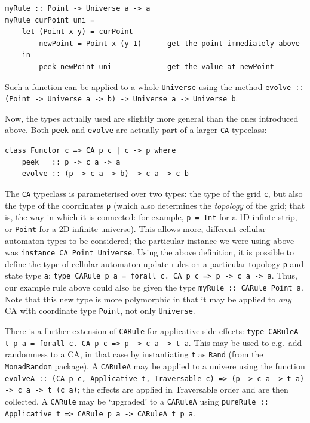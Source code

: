 \documentclass[oneside,a4paper]{memoir}
\begin{document}
\begin{verbatim}
myRule :: Point -> Universe a -> a
myRule curPoint uni =
    let (Point x y) = curPoint
        newPoint = Point x (y-1)   -- get the point immediately above
    in
        peek newPoint uni          -- get the value at newPoint
\end{verbatim}

Such a function can be applied to a whole \texttt{Universe} using the method
  \texttt{evolve~:: (Point -> Universe a -> b) -> Universe a -> Universe b}.

Now, the types actually used are slightly more general than the ones introduced above.
Both \texttt{peek} and \texttt{evolve} are actually part of a larger \texttt{CA} typeclass:

\begin{verbatim}
class Functor c => CA p c | c -> p where
    peek   :: p -> c a -> a
    evolve :: (p -> c a -> b) -> c a -> c b
\end{verbatim}

The \texttt{CA} typeclass is parameterised over two types:
  the type of the grid \texttt{c},
  but also the type of the coordinates \texttt{p}
  (which also determines the \emph{topology} of the grid; that is, the way in which it is connected:
    for example, \texttt{p = Int} for a 1D infinte strip, or \texttt{Point} for a 2D infinite universe).
This allows more, different cellular automaton types to be considered;
  the particular instance we were using above was \texttt{instance~CA Point Universe}.
Using the above definition, it is possible to define the type of cellular automaton update rules
  on a particular topology \texttt{p} and state type \texttt{a}:
  \texttt{type CARule p a = forall c. CA p c => p -> c a -> a}.
Thus, our example rule above could also be given the type \texttt{myRule :: CARule Point a}.
Note that this new type is more polymorphic
  in that it may be applied to \textit{any} CA with coordinate type \texttt{Point},
  not only \texttt{Universe}.

There is a further extension of \texttt{CARule} for applicative side-effects:
  \texttt{type CARuleA t p a = forall c. CA p c => p -> c a -> t a}.
This may be used to e.g.\ add randomness to a CA,
  in that case by instantiating \texttt{t} as \texttt{Rand} (from the \texttt{MonadRandom} package).
A \texttt{CARuleA} may be applied to a univere using the function
  \texttt{evolveA :: (CA p c, Applicative t, Traversable c) => (p -> c a -> t a) -> c a -> t (c a)};
  the effects are applied in Traversable order and are then collected.
A \texttt{CARule} may be `upgraded' to a \texttt{CARuleA} using \texttt{pureRule :: Applicative t => CARule p a -> CARuleA t p a}.
\end{document}
